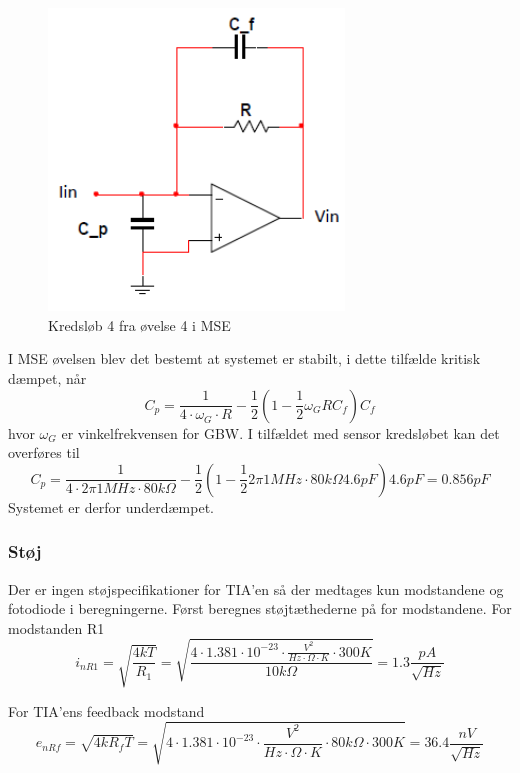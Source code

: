 \documentclass[HardwareDesign/HardwareDesign_main.tex]{subfiles}
\begin{document}
\begin{figure}
    \centering
    \includegraphics[width=0.7\textwidth]{HardwareDesign/CupSensor/graphics/MSE_EXC_4_opg_4.png}
    \caption{Kredsløb 4 fra øvelse 4 i MSE}
    \label{fig:MSE_4_kreds_4}
\end{figure}

I MSE øvelsen blev det bestemt at systemet er stabilt, i dette tilfælde kritisk dæmpet, når $$C_p=\frac{1}{4\cdot \omega_G \cdot R} - \frac{1}{2}\left( 1 - \frac{1}{2}\omega_G R C_f \right)C_f$$
hvor $\omega_G$ er vinkelfrekvensen for GBW. I tilfældet med sensor kredsløbet kan det overføres til
$$C_p = \frac{1}{4\cdot 2\pi 1\si{MHz} \cdot 80\si{k\Omega}} - \frac{1}{2}\left( 1 - \frac{1}{2} 2\pi 1\si{MHz} \cdot 80\si{k\Omega} 4.6\si{pF} \right)4.6\si{pF} = 0.856\si{pF}$$
Systemet er derfor underdæmpet.

\subsubsection{Støj}
Der er ingen støjspecifikationer for TIA'en så der medtages kun modstandene og fotodiode i beregningerne. 
Først beregnes støjtæthederne på for modstandene.
For modstanden R1
$$i_{nR1} = \sqrt{\frac{4kT}{R_1}} = \sqrt{
\frac{
4\cdot 1.381 \cdot 10^{-23} \cdot \si{
    \frac{V^2}{Hz \cdot \Omega \cdot K}
    }
\cdot 300 \si{K}}{10\si{k\Omega}} } = 1.3 \si{\frac{pA}{\sqrt{Hz}}}$$

For TIA'ens feedback modstand
$$e_{nRf} = \sqrt{4kR_fT} = \sqrt{4\cdot 1.381 \cdot 10^{-23} \cdot  \si{\frac{V^2}{\si{Hz \cdot \Omega \cdot K}}} \cdot 80\si{k\Omega} \cdot 300 \si{K}} = 36.4 \si{\frac{nV}{\sqrt{Hz}}}$$
\end{document}
